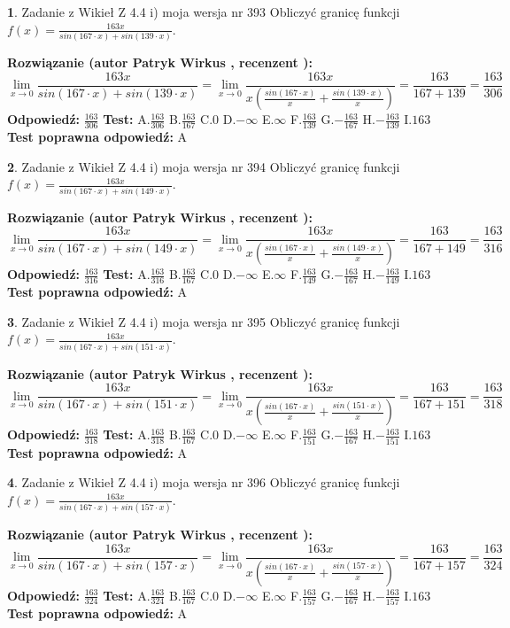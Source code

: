 \documentclass[12pt, a4paper]{article}
\theoremstyle{definition} %
\newtheorem{zad}{}
\newcommand{\zadStart}[1]{\begin{zad}#1\newline}
\newcommand{\zadStop}{\end{zad}}
\newcommand{\rozwStart}[2]{\noindent \textbf{Rozwiązanie (autor #1 , recenzent #2): }\newline}
\newcommand{\rozwStop}{\newline}
\newcommand{\odpStart}{\noindent \textbf{Odpowiedź:}\newline}
\newcommand{\odpStop}{\newline}
\newcommand{\testStart}{\noindent \textbf{Test:}\newline}
\newcommand{\testStop}{\newline}
\newcommand{\kluczStart}{\noindent \textbf{Test poprawna odpowiedź:}\newline}
\newcommand{\kluczStop}{\newline}
\begin{document}
\zadStart{Zadanie z Wikieł Z 4.4 i) moja wersja nr 393}
Obliczyć granicę funkcji $f(x)=\frac{163x}{sin(167\cdot x) +sin(139\cdot x)}$.
\zadStop
\rozwStart{Patryk Wirkus}{}
$$\lim\limits_{x\to 0}\frac{163x}{sin(167\cdot x) +sin(139\cdot x)}=\lim\limits_{x\to 0}\frac{163x}{x(\frac{sin(167\cdot x)}{x}+\frac{sin(139\cdot x)}{x})}=\frac{163}{167+139} = \frac{163}{306}$$
\rozwStop
\odpStart
$\frac{163}{306}$
\odpStop
\testStart
A.$\frac{163}{306}$
B.$\frac{163}{167}$
C.$0$
D.$-\infty$
E.$\infty$
F.$\frac{163}{139}$
G.$-\frac{163}{167}$
H.$-\frac{163}{139}$
I.$163$
\testStop
\kluczStart
A
\kluczStop



\zadStart{Zadanie z Wikieł Z 4.4 i) moja wersja nr 394}
Obliczyć granicę funkcji $f(x)=\frac{163x}{sin(167\cdot x) +sin(149\cdot x)}$.
\zadStop
\rozwStart{Patryk Wirkus}{}
$$\lim\limits_{x\to 0}\frac{163x}{sin(167\cdot x) +sin(149\cdot x)}=\lim\limits_{x\to 0}\frac{163x}{x(\frac{sin(167\cdot x)}{x}+\frac{sin(149\cdot x)}{x})}=\frac{163}{167+149} = \frac{163}{316}$$
\rozwStop
\odpStart
$\frac{163}{316}$
\odpStop
\testStart
A.$\frac{163}{316}$
B.$\frac{163}{167}$
C.$0$
D.$-\infty$
E.$\infty$
F.$\frac{163}{149}$
G.$-\frac{163}{167}$
H.$-\frac{163}{149}$
I.$163$
\testStop
\kluczStart
A
\kluczStop



\zadStart{Zadanie z Wikieł Z 4.4 i) moja wersja nr 395}
Obliczyć granicę funkcji $f(x)=\frac{163x}{sin(167\cdot x) +sin(151\cdot x)}$.
\zadStop
\rozwStart{Patryk Wirkus}{}
$$\lim\limits_{x\to 0}\frac{163x}{sin(167\cdot x) +sin(151\cdot x)}=\lim\limits_{x\to 0}\frac{163x}{x(\frac{sin(167\cdot x)}{x}+\frac{sin(151\cdot x)}{x})}=\frac{163}{167+151} = \frac{163}{318}$$
\rozwStop
\odpStart
$\frac{163}{318}$
\odpStop
\testStart
A.$\frac{163}{318}$
B.$\frac{163}{167}$
C.$0$
D.$-\infty$
E.$\infty$
F.$\frac{163}{151}$
G.$-\frac{163}{167}$
H.$-\frac{163}{151}$
I.$163$
\testStop
\kluczStart
A
\kluczStop



\zadStart{Zadanie z Wikieł Z 4.4 i) moja wersja nr 396}
Obliczyć granicę funkcji $f(x)=\frac{163x}{sin(167\cdot x) +sin(157\cdot x)}$.
\zadStop
\rozwStart{Patryk Wirkus}{}
$$\lim\limits_{x\to 0}\frac{163x}{sin(167\cdot x) +sin(157\cdot x)}=\lim\limits_{x\to 0}\frac{163x}{x(\frac{sin(167\cdot x)}{x}+\frac{sin(157\cdot x)}{x})}=\frac{163}{167+157} = \frac{163}{324}$$
\rozwStop
\odpStart
$\frac{163}{324}$
\odpStop
\testStart
A.$\frac{163}{324}$
B.$\frac{163}{167}$
C.$0$
D.$-\infty$
E.$\infty$
F.$\frac{163}{157}$
G.$-\frac{163}{167}$
H.$-\frac{163}{157}$
I.$163$
\testStop
\kluczStart
A
\kluczStop
\end{document}
